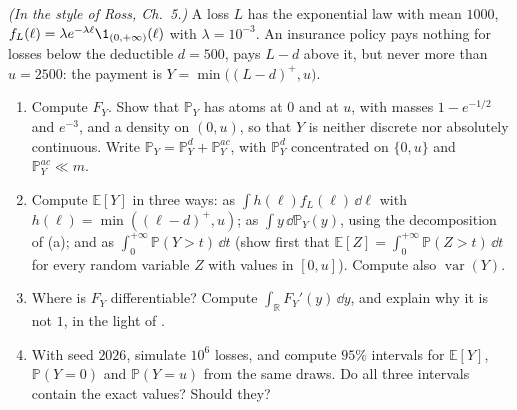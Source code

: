 \begin{exercise}\label{ex:ld-insurance}
\hard \emph{(In the style of Ross, Ch.~5.)} A loss $L$ has the exponential law with mean $1000$,
$f_L(\ell)=\lambda e^{-\lambda\ell}\1_{(0,+\infty)}(\ell)$ with $\lambda=10^{-3}$. An insurance policy
pays nothing for losses below the deductible $d=500$, pays $L-d$ above it, but never more than
$u=2500$: the payment is $Y=\min\big((L-d)^+,u\big)$.
\begin{enumerate}[label=(\alph*)]
  \item Compute $F_Y$. Show that $\mathbb P_Y$ has atoms at $0$ and at $u$, with masses
    $1-e^{-1/2}$ and $e^{-3}$, and a density on $(0,u)$, so that $Y$ is neither discrete nor
    absolutely continuous. Write $\mathbb P_Y=\mathbb P_Y^{d}+\mathbb P_Y^{ac}$, with
    $\mathbb P_Y^{d}$ concentrated on $\{0,u\}$ and $\mathbb P_Y^{ac}\ll m$.
  \item Compute $\mathbb E[Y]$ in three ways: as $\int h(\ell)f_L(\ell)\,\dd\ell$ with
    $h(\ell)=\min((\ell-d)^+,u)$; as $\int y\,\dd\mathbb P_Y(y)$, using the decomposition of (a); and as
    $\int_0^{+\infty}\mathbb P(Y>t)\,\dd t$ (show first that $\mathbb E[Z]=\int_0^{+\infty}\mathbb P(Z>t)\,\dd t$
    for every random variable $Z$ with values in $[0,u]$). Compute also $\operatorname{var}(Y)$.
  \item Where is $F_Y$ differentiable? Compute $\int_{\mathbb R}F_Y'(y)\,\dd y$, and explain why it is not
    $1$, in the light of .
  \item With seed $2026$, simulate $10^6$ losses, and compute $95\%$ intervals for $\mathbb E[Y]$,
    $\mathbb P(Y=0)$ and $\mathbb P(Y=u)$ from the same draws. Do all three intervals contain the exact
    values? Should they?
\end{enumerate}
\end{exercise}
